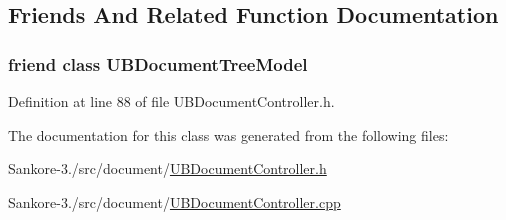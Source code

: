 \subsection{Friends And Related Function Documentation}
\hypertarget{class_u_b_document_tree_node_a67c37643a244d3a945253d93304fb8ff}{
\subsubsection[{U\-B\-Document\-Tree\-Model}]{\setlength{\rightskip}{0pt plus 5cm}friend class {\bf U\-B\-Document\-Tree\-Model}\hspace{0.3cm}{\ttfamily [friend]}}}\label{de/d8b/class_u_b_document_tree_node_a67c37643a244d3a945253d93304fb8ff}


Definition at line 88 of file U\-B\-Document\-Controller.\-h.



The documentation for this class was generated from the following files\-:\begin{DoxyCompactItemize}
\item 
Sankore-\/3./src/document/\hyperlink{_u_b_document_controller_8h}{U\-B\-Document\-Controller.\-h}\item 
Sankore-\/3./src/document/\hyperlink{_u_b_document_controller_8cpp}{U\-B\-Document\-Controller.\-cpp}\end{DoxyCompactItemize}
